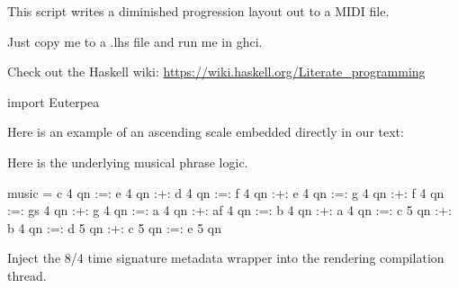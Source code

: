 \documentclass{article}
\begin{document}
This script writes a diminished progression layout out to a MIDI file.

Just copy me to a .lhs file and run me in ghci.

Check out the Haskell wiki: \url{https://wiki.haskell.org/Literate_programming}

\begin{code}
import Euterpea
\end{code}

Here is an example of an ascending scale embedded directly in our text:


Here is the underlying musical phrase logic.

\begin{code}
music = c 4 qn :=: e 4 qn :+: d 4 qn :=: f 4 qn :+:
        e 4 qn :=: g 4 qn :+: f 4 qn :=: gs 4 qn :+:
        g 4 qn :=: a 4 qn :+: af 4 qn :=: b 4 qn :+:
        a 4 qn :=: c 5 qn :+: b 4 qn :=: d 5 qn :+:
        c 5 qn :=: e 5 qn
\end{code}

Inject the 8/4 time signature metadata wrapper into the rendering compilation thread.

\end{document}
